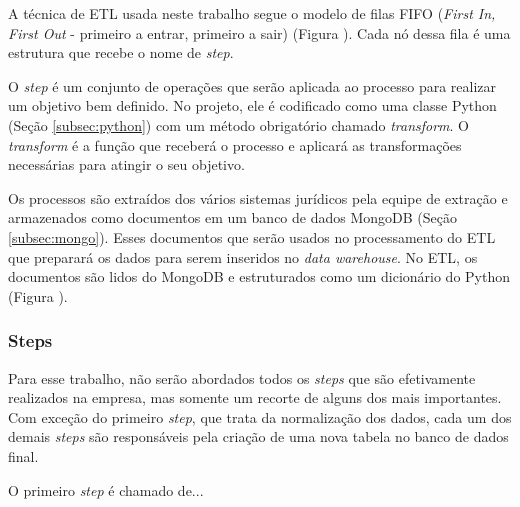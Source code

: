 A técnica de ETL usada neste trabalho segue o modelo de filas FIFO (\textit{First In, First Out} - primeiro a entrar, primeiro a sair) (Figura ). Cada nó dessa fila é uma estrutura que recebe o nome de \textit{step}.


O \textit{step} é um conjunto de operações que serão aplicada ao processo para realizar um objetivo bem definido. No projeto, ele é codificado como uma classe Python (Seção \ref{subsec:python}) com um método obrigatório chamado \textit{transform}. O \textit{transform} é a função que receberá o processo e aplicará as transformações necessárias para atingir o seu objetivo.


Os processos são extraídos dos vários sistemas jurídicos pela equipe de extração e armazenados como documentos em um banco de dados MongoDB (Seção \ref{subsec:mongo}). Esses documentos que serão usados no processamento do ETL que preparará os dados para serem inseridos no \textit{data warehouse}. No ETL, os documentos são lidos do MongoDB e estruturados como um dicionário do Python (Figura ).


\subsubsection{Steps}
\label{steps}

Para esse trabalho, não serão abordados todos os \textit{steps} que são efetivamente realizados na empresa, mas somente um recorte de alguns dos mais importantes. Com exceção do primeiro \textit{step}, que trata da normalização dos dados, cada um dos demais \textit{steps} são responsáveis pela criação de uma nova tabela no banco de dados final.

O primeiro \textit{step} é chamado de...